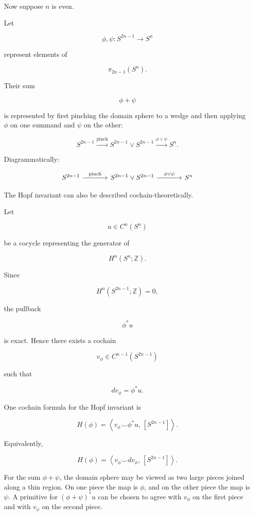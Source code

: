 \documentclass[12pt,a4paper]{article}
\theoremstyle{notespace}
\begin{document}
Now suppose \(n\) is even.

Let

\[
\phi,\psi:S^{2n-1}\to S^n
\]

represent elements of

\[
\pi_{2n-1}(S^n).
\]

Their sum

\[
\phi+\psi
\]

is represented by first pinching the domain sphere to a wedge and then applying \(\phi\) on one summand and \(\psi\) on the other:

\[
S^{2n-1}
\xrightarrow{\text{pinch}}
S^{2n-1}\vee S^{2n-1}
\xrightarrow{\phi\vee \psi}
S^n.
\]

Diagrammatically:

\[
\begin{tikzcd}[column sep=large]
	S^{2n-1}
	\arrow[r,"\text{pinch}"]
	&
	S^{2n-1}\vee S^{2n-1}
	\arrow[r,"\phi\vee\psi"]
	&
	S^n
\end{tikzcd}
\]

The Hopf invariant can also be described cochain-theoretically.

Let

\[
u\in C^n(S^n)
\]

be a cocycle representing the generator of

\[
H^n(S^n;\mathbb Z).
\]

Since

\[
H^n(S^{2n-1};\mathbb Z)=0,
\]

the pullback

\[
\phi^*u
\]

is exact. Hence there exists a cochain

\[
v_\phi\in C^{n-1}(S^{2n-1})
\]

such that

\[
dv_\phi=\phi^*u.
\]

One cochain formula for the Hopf invariant is

\[
H(\phi)
=
\left\langle v_\phi\smile \phi^*u,\,[S^{2n-1}]\right\rangle.
\]

Equivalently,

\[
H(\phi)
=
\left\langle v_\phi\smile dv_\phi,\,[S^{2n-1}]\right\rangle.
\]

For the sum \(\phi+\psi\), the domain sphere may be viewed as two large pieces joined along a thin region. On one piece the map is \(\phi\), and on the other piece the map is \(\psi\). A primitive for \((\phi+\psi)^*u\) can be chosen to agree with \(v_\phi\) on the first piece and with \(v_\psi\) on the second piece.
\end{document}
